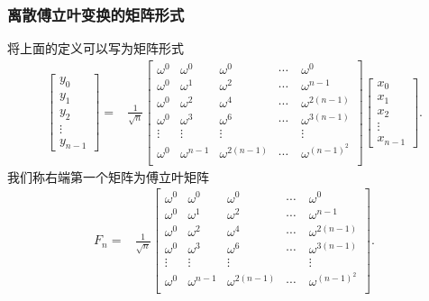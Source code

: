 \documentclass[10pt]{beamer}
\begin{document}
\begin{frame}
\frametitle{离散傅立叶变换的矩阵形式}
将上面的定义可以写为矩阵形式
\begin{align*}
\left[ \begin{array}{c}
     y_0 \\ y_1 \\y_2 \\ \vdots \\ y_{n-1}  \end{array} \right]
=& \frac{1}{\sqrt{n}} \left[ \begin{array}{ccccc}
     \omega^0    &  \omega^0 &  \omega^0 & \cdots &  \omega^0  \\
     \omega^0    &  \omega^1 &  \omega^2 & \cdots &  \omega^{n-1}  \\
     \omega^0    &  \omega^2 &  \omega^4 & \cdots &  \omega^{2(n-1)}  \\
     \omega^0    &  \omega^3 &  \omega^6 & \cdots &  \omega^{3(n-1)}  \\
     \vdots    &  \vdots & \vdots &\quad &  \vdots  \\
     \omega^0    &  \omega^{n-1} &  \omega^{2(n-1)} & \cdots &  \omega^{(n-1)^2}  \\                   
            \end{array} \right] 
\left[ \begin{array}{c}
     x_0 \\ x_1 \\ x_2 \\ \vdots \\ x_{n-1}  \end{array} \right].
\end{align*}
我们称右端第一个矩阵为傅立叶矩阵
\begin{align}
F_n = & \frac{1}{\sqrt{n}} \left[ \begin{array}{ccccc}
     \omega^0    &  \omega^0 &  \omega^0 & \cdots &  \omega^0  \\
     \omega^0    &  \omega^1 &  \omega^2 & \cdots &  \omega^{n-1}  \\
     \omega^0    &  \omega^2 &  \omega^4 & \cdots &  \omega^{2(n-1)}  \\
     \omega^0    &  \omega^3 &  \omega^6 & \cdots &  \omega^{3(n-1)}  \\
     \vdots    &  \vdots & \vdots &\quad &  \vdots  \\
     \omega^0    &  \omega^{n-1} &  \omega^{2(n-1)} & \cdots &  \omega^{(n-1)^2}  \\                   
            \end{array} \right] .
\end{align}
\end{frame}
\end{document}
